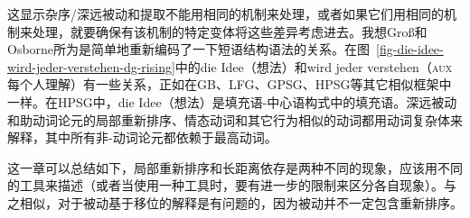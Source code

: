 \zl
这显示杂序/深远被动和提取不能用相同的机制来处理，或者如果它们用相同的机制来处理，就要确保有该机制的特定变体将这些差异考虑进去。我想Groß和Osborne所为是简单地重新编码了一下短语结构语法的关系。在图~\ref{fig-die-idee-wird-jeder-verstehen-dg-rising}中的die Idee（想法）和wird jeder verstehen（\textsc{aux} 每个人理解）有一些关系，正如在GB、LFG、GPSG、HPSG等其它相似框架中一样。在HPSG中，die Idee（想法）是填充语-中心语构式中的填充语。深远被动和助动词论元的局部重新排序、情态动词和其它行为相似的动词都用动词复杂体来解释，其中所有非-动词论元都依赖于最高动词\citep{HN94a}。

这一章可以总结如下，局部重新排序和长距离依存是两种不同的现象，应该用不同的工具来描述（或者当使用一种工具时，要有进一步的限制来区分各自现象）。与之相似，对于被动基于移位的解释是有问题的，因为被动并不一定包含重新排序。


